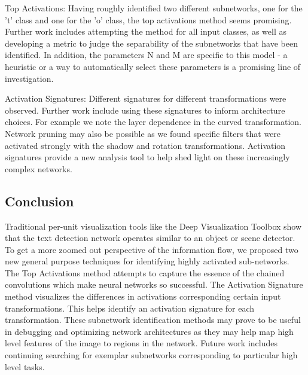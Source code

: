 \documentclass[10pt,twocolumn,letterpaper]{article}
\begin{document}
Top Activations:
Having roughly identified two different subnetworks, one for the 't' class and one for the 'o' class, the top activations method seems promising. Further work includes attempting the method for all input classes, as well as developing a metric to judge the separability of the subnetworks that have been identified. In addition, the parameters N and M are specific to this model - a heuristic or a way to automatically select these parameters is a promising line of investigation.

Activation Signatures:
Different signatures for different transformations were observed. Further work include using these signatures to inform architecture choices. For example we note the layer dependence in the curved transformation. Network pruning may also be possible as we found specific filters that were activated strongly with the shadow and rotation transformations. Activation signatures provide a new analysis tool to help shed light on these increasingly complex networks. 



\subsection{Conclusion}
Traditional per-unit visualization tools like the Deep Visualization Toolbox \cite{yosinski2015understanding} show that the text detection network operates similar to an object or scene detector. To get a more zoomed out perspective of the information flow, we proposed two new general purpose techniques for identifying highly activated sub-networks. The Top Activations method attempts to capture the essence of the chained convolutions which make neural networks so successful. The Activation Signature method visualizes the differences in activations corresponding certain input transformations. This helps identify an activation signature for each transformation. These subnetwork identification methods may prove to be useful in debugging and optimizing network architectures as they may help map high level features of the image to regions in the network. Future work includes continuing searching for exemplar subnetworks corresponding to particular high level tasks.




{\small


}
\end{document}
